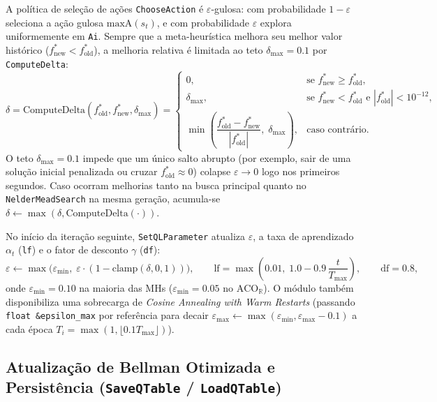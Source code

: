 \documentclass[11pt,a4paper]{article}
\begin{document}
A política de seleção de ações \texttt{ChooseAction} é $\varepsilon$-gulosa: com probabilidade $1 - \varepsilon$ seleciona a ação gulosa $\text{maxA}(s_t)$, e com probabilidade $\varepsilon$ explora uniformemente em \texttt{Ai}. Sempre que a meta-heurística melhora seu melhor valor histórico ($f^*_{\text{new}} < f^*_{\text{old}}$), a melhoria relativa é limitada ao teto $\delta_{\max} = 0.1$ por \texttt{ComputeDelta}:
\begin{equation}
  \delta = \text{ComputeDelta}(f^*_{\text{old}}, f^*_{\text{new}}, \delta_{\max}) =
  \begin{cases}
    0, & \text{se } f^*_{\text{new}} \ge f^*_{\text{old}}, \\[4pt]
    \delta_{\max}, & \text{se } f^*_{\text{new}} < f^*_{\text{old}} \text{ e } |f^*_{\text{old}}| < 10^{-12}, \\[4pt]
    \min\!\left(\dfrac{f^*_{\text{old}} - f^*_{\text{new}}}{|f^*_{\text{old}}|},\; \delta_{\max}\right), & \text{caso contrário.}
  \end{cases}
  \label{eq:computedelta}
\end{equation}
O teto $\delta_{\max} = 0.1$ impede que um único salto abrupto (por exemplo, sair de uma solução inicial penalizada ou cruzar $f^*_{\text{old}} \approx 0$) colapse $\varepsilon \to 0$ logo nos primeiros segundos. Caso ocorram melhorias tanto na busca principal quanto no \texttt{NelderMeadSearch} na mesma geração, acumula-se $\delta \leftarrow \max(\delta, \text{ComputeDelta}(\cdot))$.

No início da iteração seguinte, \texttt{SetQLParameter} atualiza $\varepsilon$, a taxa de aprendizado $\alpha_t$ (\texttt{lf}) e o fator de desconto $\gamma$ (\texttt{df}):
\begin{equation}
  \varepsilon \leftarrow \max\!\big(\varepsilon_{\min},\; \varepsilon \cdot (1 - \text{clamp}(\delta, 0, 1))\big),
  \qquad
  \text{lf} = \max\!\left(0.01,\; 1.0 - 0.9\,\frac{t}{T_{\max}}\right),
  \qquad
  \text{df} = 0.8,
  \label{eq:setql}
\end{equation}
onde $\varepsilon_{\min} = 0.10$ na maioria das MHs ($\varepsilon_{\min} = 0.05$ no $\text{ACO}_{\mathbb{R}}$). O módulo também disponibiliza uma sobrecarga de \emph{Cosine Annealing with Warm Restarts} (passando \texttt{float \&epsilon\_max} por referência para decair $\varepsilon_{\max} \leftarrow \max(\varepsilon_{\min}, \varepsilon_{\max} - 0.1)$ a cada época $T_i = \max(1, \lfloor 0.1 T_{\max} \rfloor)$).

\subsection{Atualização de Bellman Otimizada e Persistência (\texttt{SaveQTable} / \texttt{LoadQTable})}
\end{document}
